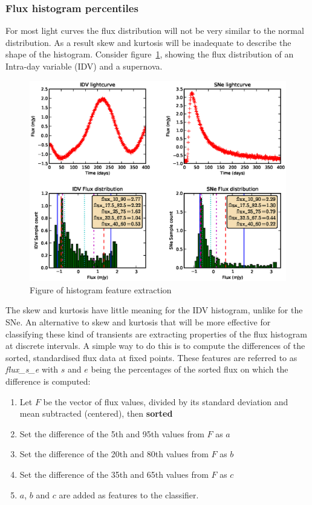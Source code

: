 \documentclass[10pt]{report}
\begin{document}
	
	
	\subsubsection{Flux histogram percentiles}
	For most light curves the flux distribution will not be very similar to the normal distribution. As a result skew and kurtosis will be inadequate to describe the shape of the histogram. Consider figure~\ref{fig:histograms}, showing the flux distribution of an Intra-day variable (IDV) and a supernova.  \\
	
	\begin{figure}[ht!]
		\centering
		\label{fig:histograms}
		\includegraphics[width=\textwidth]{figures/fluxperc_demo.eps}
		\caption{Figure of histogram feature extraction}
	\end{figure}
	
	The skew and kurtosis have little meaning for the IDV histogram, unlike for the SNe. An alternative to skew and kurtosis that will be more effective for classifying these kind of transients are extracting properties of the flux histogram at discrete intervals. A simple way to do this is to compute the differences of the sorted, standardised flux data at fixed points. These features are referred to as \emph{flux\_s\_e} with $s$ and $e$ being the percentages of the sorted flux on which the difference is computed:
	
	\begin{enumerate}
		\item Let $F$ be the vector of flux values, divided by its standard deviation and mean subtracted (centered), then \textbf{sorted}
		\item Set the difference of the 5th and 95th values from $F$ as $a$
		\item Set the difference of the 20th and 80th values from $F$ as $b$
		\item Set the difference of the 35th and 65th values from $F$ as $c$
		\item $a$, $b$ and $c$ are added as features to the classifier.
	\end{enumerate}
\end{document}
